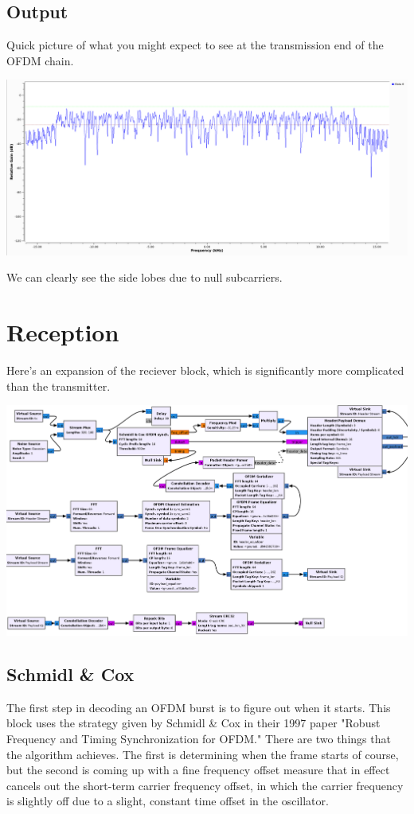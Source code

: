 \documentclass[11pt]{article}
\begin{document}
\subsection{Output}
\label{sec:org4f7013e}
Quick picture of what you might expect to see at the transmission end
of the OFDM chain.

\begin{center}
\includegraphics[width=\textwidth]{./images/frequency.png}
\end{center}

We can clearly see the side lobes due to null subcarriers.
\section{Reception}
\label{sec:org02e0524}
Here's an expansion of the reciever block, which is significantly more
complicated than the transmitter.

\begin{center}
\includegraphics[width=\textwidth]{./images/ofdm_rx.png}
\end{center}
\subsection{Schmidl \& Cox}
\label{sec:orgf812dcc}
The first step in decoding an OFDM burst is to figure out when it
starts. This block uses the strategy given by Schmidl \& Cox in their
1997 paper "Robust Frequency and Timing Synchronization for OFDM."
There are two things that the algorithm achieves. The first is
determining when the frame starts of course, but the second is coming
up with a fine frequency offset measure that in effect cancels out the
short-term carrier frequency offset, in which the carrier frequency is
slightly off due to a slight, constant time offset in the oscillator.
\end{document}
